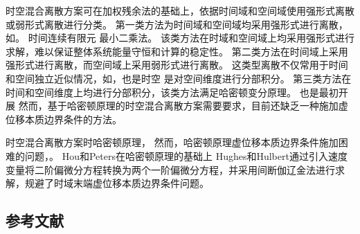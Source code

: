 时空混合离散方案可在加权残余法的基础上，依据时间域和空间域使用强形式离散或弱形式离散进行分类。
第一类方法为时间域和空间域均采用强形式进行离散，如。
时间连续有限元\cite{vondanwitz2023}
最小二乘法\cite{epstein2024}。
该类方法在时域和空间域上均采用强形式进行求解，难以保证整体系统能量守恒和计算的稳定性。
第二类方法在时间域上采用强形式进行离散，而空间域上采用弱形式进行离散。
这类型离散不仅常用于时间和空间独立近似情况，如，也是时空
是对空间维度进行分部积分。
第三类方法在时间和空间维度上均进行分部积分，该类方法满足哈密顿变分原理。
也是最初开展
然而，基于哈密顿原理的时空混合离散方案需要要求，目前还缺乏一种施加虚位移本质边界条件的方法。

时空混合离散方案时哈密顿原理，
然而，哈密顿原理虚位移本质边界条件施加困难的问题，。
Hou和Peters在哈密顿原理的基础上\cite{hou1994}
Hughes和Hulbert\cite{hughes1988}通过引入速度变量将二阶偏微分方程转换为两个一阶偏微分方程，并采用间断伽辽金法进行求解，规避了时域末端虚位移本质边界条件问题。


\vspace{-5pt}

\begin{REF}
	\subsection*{参考文献}
	\vspace{-50pt}
	
\end{REF}

\newpage%
